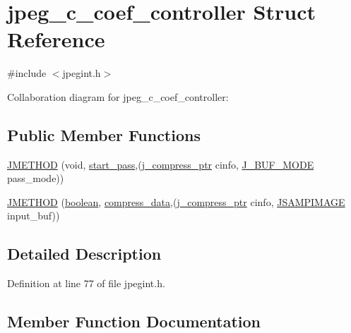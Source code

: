 \hypertarget{structjpeg__c__coef__controller}{}\section{jpeg\+\_\+c\+\_\+coef\+\_\+controller Struct Reference}
\label{structjpeg__c__coef__controller}


{\ttfamily \#include $<$jpegint.\+h$>$}



Collaboration diagram for jpeg\+\_\+c\+\_\+coef\+\_\+controller\+:
\subsection*{Public Member Functions}
\begin{DoxyCompactItemize}
\item 
\mbox{\hyperlink{structjpeg__c__coef__controller_a975b8ac2bcd4ea8065eb676ea805d78e}{J\+M\+E\+T\+H\+OD}} (void, \mbox{\hyperlink{jddctmgr_8c_a1964f006adb8fb80f57e455f6452aec1}{start\+\_\+pass}},(\mbox{\hyperlink{jpeglib_8h_add2a072c54e3a51550f4975f7ddb91e7}{j\+\_\+compress\+\_\+ptr}} cinfo, \mbox{\hyperlink{jpegint_8h_a1f0803342372ac62b6903c399399c874}{J\+\_\+\+B\+U\+F\+\_\+\+M\+O\+DE}} pass\+\_\+mode))
\item 
\mbox{\hyperlink{structjpeg__c__coef__controller_a1aaf8a93ba0bd239b36f4d48657c88ee}{J\+M\+E\+T\+H\+OD}} (\mbox{\hyperlink{jmorecfg_8h_a7c6368b321bd9acd0149b030bb8275ed}{boolean}}, \mbox{\hyperlink{jccoefct_8c_a1b0b1f4c0a7f4ce97c00607f23977d6c}{compress\+\_\+data}},(\mbox{\hyperlink{jpeglib_8h_add2a072c54e3a51550f4975f7ddb91e7}{j\+\_\+compress\+\_\+ptr}} cinfo, \mbox{\hyperlink{jpeglib_8h_a4bf858e4d42202287e786bdec2f3b62b}{J\+S\+A\+M\+P\+I\+M\+A\+GE}} input\+\_\+buf))
\end{DoxyCompactItemize}


\subsection{Detailed Description}


Definition at line 77 of file jpegint.\+h.



\subsection{Member Function Documentation}
\mbox{\label{structjpeg__c__coef__controller_a975b8ac2bcd4ea8065eb676ea805d78e}} 
